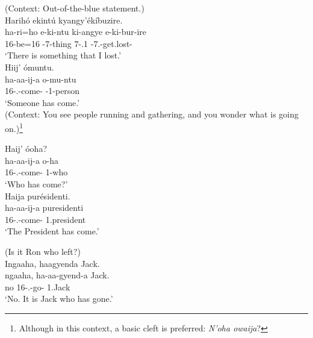\documentclass[output=paper]{langscibook}
\begin{document}
\ea
\label{bkm:Ref111455458}
(Context: Out-of-the-blue statement.)\\
Harihó ekintú kyangy’ékíbuzire.\\
\gll
ha-ri=ho  e-ki-ntu  ki-angye  e-ki-bur-ire\\
16\SM{}-be=16  \AUG{}-7-thing  7-\POSS{}.1\SG{}  \AUG{}-7\SM{}.\REL{}-get.lost-\PFV{}\\
\glt
‘There is something that I lost.’\\

\ex
\label{bkm:Ref111455460}
Hiij’ ómuntu.\\
\gll
ha-aa-ij-a  o-mu-ntu\\
16\SM{}-\N{}.\PST{}-come-\FV{}  \AUG{}-1-person\\
\glt
‘Someone has come.’\\
\ex
\label{bkm:Ref111455483}
 (Context: You see people running and gathering, and you wonder what is going on.)\footnote{Although in this context, a basic cleft is preferred: \textit{N’oha owaija}?}

\ea
Haij’ óoha?\\
\gll
ha-aa-ij-a  o-ha\\
16\SM{}-\N{}.\PST{}-come-\FV{}  1-who\\
\glt
‘Who has come?’\\


\ex
Haija purésidenti.\\
\gll
ha-aa-ij-a  puresidenti\\
16\SM{}-\N{}.\PST{}-come-\FV{}  1.president\\
\glt
‘The President has come.’\\


\z
\z

\ea
\label{bkm:Ref113452874}
(Is it Ron who left?)\\
Ingaaha,  haagyenda  Jack.\\
\gll
ngaaha,  ha-aa-gyend-a  Jack.\\
no  16\SM{}-\N.\PST{}-go-\FV{}  1.Jack\\
\glt
‘No. It is Jack who has gone.’\\
\end{document}
